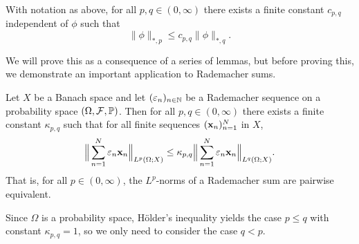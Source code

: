 \begin{thm}\label{thm:jn-adapted-sequences}
  With notation as above, for all $p,q \in (0,\infty)$ there exists a finite constant $c_{p,q}$ independent of $\phi$ such that
  \begin{equation*}
    \|\phi\|_{*,p} \leq c_{p,q} \|\phi\|_{*,q}.
  \end{equation*}
\end{thm}

We will prove this as a consequence of a series of lemmas, but before proving this, we demonstrate an important application to Rademacher sums.

\begin{thm}\label{thm:kk}
  Let $X$ be a Banach space and let $(\varepsilon_{n})_{n \in \mathbb{N}}$ be a Rademacher sequence on a probability space $(\Omega,\mathcal{F},\mathbb{P})$.
  Then for all $p,q \in (0,\infty)$ there exists a finite constant $\kappa_{p,q}$ such that for all finite sequences $(\mathbf{x}_n)_{n=1}^N$ in $X$,
  \begin{equation*}
    \Big\|\sum_{n=1}^{N} \varepsilon_{n} \mathbf{x}_{n} \Big\|_{L^p(\Omega;X)} \leq \kappa_{p,q} \Big\|\sum_{n=1}^{N} \varepsilon_{n} \mathbf{x}_{n} \Big\|_{L^q(\Omega;X)}.
  \end{equation*}
  That is, for all $p \in (0,\infty)$, the $L^p$-norms of a Rademacher sum are pairwise equivalent.  
\end{thm}

Since $\Omega$ is a probability space, H\"older's inequality yields the case $p \leq q$ with constant $\kappa_{p,q} = 1$, so we only need to consider the case $q < p$.

